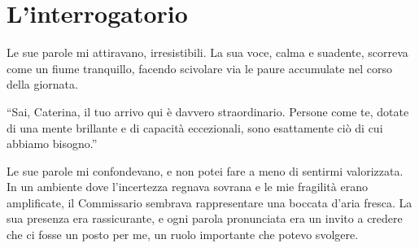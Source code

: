 \section{L'interrogatorio}
\begin{center}
\begin{minipage}{0.7\textwidth}
    \centering
\end{minipage}
\end{center}
Le sue parole mi attiravano, irresistibili. La sua voce, calma e suadente, scorreva come un fiume tranquillo, facendo scivolare via le paure accumulate nel corso della giornata.

\begin{dialogue}
 \enquote{Sai, Caterina, il tuo arrivo qui è davvero straordinario. Persone come te, dotate di una mente brillante e di capacità eccezionali, sono esattamente ciò di cui abbiamo bisogno.}
\end{dialogue}

Le sue parole mi confondevano, e non potei fare a meno di sentirmi valorizzata. In un ambiente dove l'incertezza regnava sovrana e le mie fragilità erano amplificate, il Commissario sembrava rappresentare una boccata d'aria fresca. La sua presenza era rassicurante, e ogni parola pronunciata era un invito a credere che ci fosse un posto per me, un ruolo importante che potevo svolgere.

